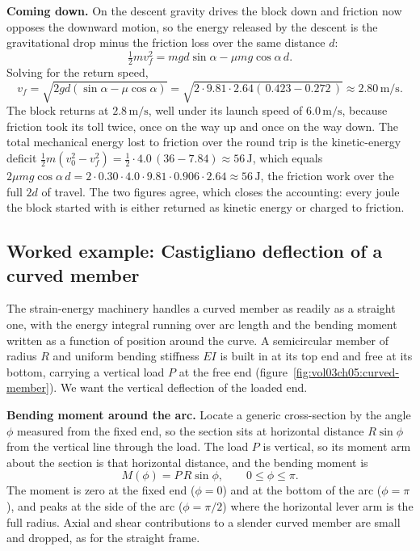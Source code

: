 \textbf{Coming down.} On the descent gravity drives the block down and
friction now opposes the downward motion, so the energy released by the
descent is the gravitational drop minus the friction loss over the same
distance $d$:
\[
\tfrac12 m v_f^2 = m g d \sin\alpha - \mu m g \cos\alpha\, d.
\]
Solving for the return speed,
\[
v_f = \sqrt{2 g d(\sin\alpha - \mu\cos\alpha)}
= \sqrt{2 \cdot 9.81 \cdot 2.64 (\,0.423 - 0.272\,)}
\approx 2.80\,\si{\meter\per\second}.
\]
The block returns at $2.8\,\si{\meter\per\second}$, well under its launch
speed of $6.0\,\si{\meter\per\second}$, because friction took its toll
twice, once on the way up and once on the way down. The total mechanical
energy lost to friction over the round trip is the kinetic-energy deficit
$\tfrac12 m(v_0^2 - v_f^2) = \tfrac12\cdot 4.0\,(36 - 7.84) \approx
56\,\si{\joule}$, which equals $2\mu m g\cos\alpha\,d = 2\cdot 0.30\cdot
4.0\cdot 9.81\cdot 0.906\cdot 2.64 \approx 56\,\si{\joule}$, the friction
work over the full $2d$ of travel. The two figures agree, which closes
the accounting: every joule the block started with is either returned as
kinetic energy or charged to friction.

\subsection{Worked example: Castigliano deflection of a curved member}

The strain-energy machinery handles a curved member as readily as a straight
one, with the energy integral running over arc length and the bending moment
written as a function of position around the curve. A semicircular member of
radius $R$ and uniform bending stiffness $EI$ is built in at its top end and
free at its bottom, carrying a vertical load $P$ at the free end
(figure~\ref{fig:vol03ch05:curved-member}). We want the vertical deflection
of the loaded end.



\textbf{Bending moment around the arc.} Locate a generic cross-section by the
angle $\phi$ measured from the fixed end, so the section sits at horizontal
distance $R\sin\phi$ from the vertical line through the load. The load $P$ is
vertical, so its moment arm about the section is that horizontal distance,
and the bending moment is
\[
M(\phi) = P\,R\sin\phi,\qquad 0 \le \phi \le \pi.
\]
The moment is zero at the fixed end ($\phi = 0$) and at the bottom of the arc
($\phi = \pi$), and peaks at the side of the arc ($\phi = \pi/2$) where the
horizontal lever arm is the full radius. Axial and shear contributions to a
slender curved member are small and dropped, as for the straight frame.

